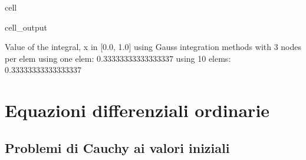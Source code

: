 \documentclass[letterpaper,10pt,english]{jupyterBook}
\begin{document}
\begin{sphinxuseclass}{cell}
\begin{sphinxVerbatimOutput}
\begin{sphinxuseclass}{cell_output}
\begin{sphinxVerbatim}[commandchars=\\\{\}]
Value of the integral, x \PYGZbs{}in [0.0, 1.0] using Gauss integration methods with 3 nodes per elem
\PYGZhy{} using one elem: 0.33333333333333337
\PYGZhy{} using 10 elems: 0.33333333333333337
\end{sphinxVerbatim}

\end{sphinxuseclass}\end{sphinxVerbatimOutput}

\end{sphinxuseclass}
\sphinxstepscope


\section{Equazioni differenziali ordinarie}
\label{\detokenize{ch/numerics/ode:equazioni-differenziali-ordinarie}}\label{\detokenize{ch/numerics/ode::doc}}
\sphinxstepscope


\subsection{Problemi di Cauchy ai valori iniziali}
\label{\detokenize{ch/numerics/ode-cauchy:problemi-di-cauchy-ai-valori-iniziali}}\label{\detokenize{ch/numerics/ode-cauchy::doc}}
\end{document}
